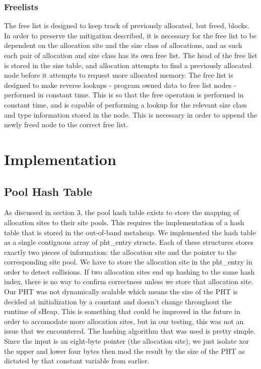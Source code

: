 \documentclass[conference]{IEEEtran}
\begin{document}
\subsubsection{Freelists}
The free list is designed to keep track of previously allocated, but freed, blocks. 
In order to preserve the mitigation described, it is necessary for the free list 
to be dependent on the allocation site and the size class of allocations, and as 
such each pair of allocation and size class has its own free list. The head of 
the free list is stored in the size table, and allocation attempts to find a 
previously allocated node before it attempts to request more allocated memory. The 
free list is designed to make reverse lookups - program owned data to free list 
nodes - performed in constant time. This is so that the free operation is performed 
in constant time, and is capable of performing a lookup for the relevant size class 
and type information stored in the node. This is necessary in order to append the 
newly freed node to the correct free list.

\section{Implementation}

\subsection{Pool Hash Table}
As discussed in section 3, the pool hash table exists to store the mapping of 
allocation sites to their site pools. This requires the implementation of a hash 
table that is stored in the out-of-band metaheap. We implemented the hash table as 
a single contiguous array of pht\_entry structs. Each of these structures stores 
exactly two pieces of information: the allocation site and the pointer to the 
corresponding site pool. We have to store the allocation site in the pht\_entry in 
order to detect collisions. If two allocation sites end up hashing to the same 
hash index, there is no way to confirm correctness unless we store that allocation 
site. Our PHT was not dynamically scalable which means the size of the PHT is 
decided at initialization by a constant and doesn’t change throughout the runtime 
of sHeap. This is something that could be improved in the future in order to 
accomodate more allocation sites, but in our testing, this was not an issue that 
we encountered. The hashing algorithm that was used is pretty simple. Since the 
input is an eight-byte pointer (the allocation site), we just isolate xor the 
upper and lower four bytes then mod the result by the size of the PHT as 
dictated by that constant variable from earlier.
\end{document}
